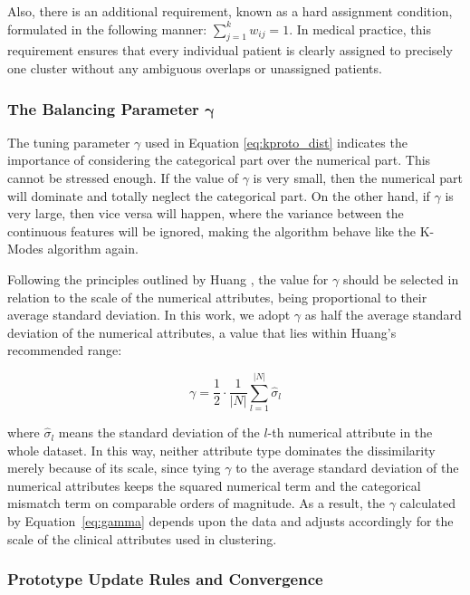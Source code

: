 Also, there is an additional requirement, known as a hard assignment condition, formulated in the following manner: $\sum_{j=1}^k w_{ij}=1$. In medical practice, this requirement ensures that every individual patient is clearly assigned to precisely one cluster without any ambiguous overlaps or unassigned patients.

\subsubsection*{The Balancing Parameter $\boldsymbol{\gamma}$}

The tuning parameter $\gamma$ used in Equation \ref{eq:kproto_dist} indicates the importance of considering the categorical part over the numerical part. This cannot be stressed enough. If the value of $\gamma$ is very small, then the numerical part will dominate and totally neglect the categorical part. On the other hand, if $\gamma$ is very large, then vice versa will happen, where the variance between the continuous features will be ignored, making the algorithm behave like the K-Modes algorithm again.

Following the principles outlined by Huang \cite{huang1998}, the value for $\gamma$ should be selected in  relation to the scale of the numerical attributes, being proportional to their average standard deviation. In this work, we adopt $\gamma$ as half the average standard deviation of the numerical attributes, a value that lies within Huang's recommended range:

\begin{equation}
    \gamma = \frac{1}{2} \cdot \frac{1}{|N|} \sum_{l=1}^{|N|} \hat{\sigma}_l
    \label{eq:gamma}
\end{equation}

where $\hat{\sigma}_l$ means the standard deviation of the $l$-th numerical attribute in the whole dataset. In this way, neither attribute type dominates the dissimilarity merely because of its scale, since tying $\gamma$ to the average standard deviation of the numerical attributes keeps the squared numerical term and the categorical mismatch term on comparable orders of magnitude. As a result, the $\gamma$ calculated by Equation~\eqref{eq:gamma} depends upon the data and adjusts accordingly for the scale of the clinical attributes used in clustering.

\subsubsection*{Prototype Update Rules and Convergence}

